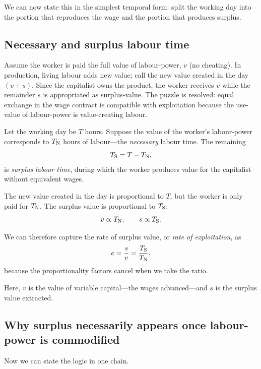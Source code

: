\medskip

We can now state this in the simplest temporal form: split the working day into the portion that
reproduces the wage and the portion that produces surplus.

\medskip

\subsection{Necessary and surplus labour time}

Assume the worker is paid the full value of labour-power, $v$ (no cheating). In
production, living labour adds new value; call the new value created in the day
$(v+s)$. Since the capitalist owns the product, the worker receives $v$ while the
remainder $s$ is appropriated as surplus-value. The puzzle is resolved: equal
exchange in the wage contract is compatible with exploitation because the use-value
of labour-power is value-creating labour.

Let the working day be $T$ hours. Suppose the value of the worker’s labour-power
corresponds to $T_{\mathrm{N}}$ hours of labour---the \emph{necessary} labour time. The
remaining
\begin{equation}
  T_{\mathrm{S}} = T - T_{\mathrm{N}},
  \label{eq:Ts}
\end{equation}
is \emph{surplus labour time}, during which the worker produces value for the
capitalist without equivalent wages.

The new value created in the day is proportional to $T$, but the worker is only
paid for $T_{\mathrm{N}}$. The surplus value is proportional to $T_{\mathrm{S}}$:
\[
  v \propto T_{\mathrm{N}},
  \qquad
  s \propto T_{\mathrm{S}}.
\]

We can therefore capture the rate of surplus value, or \emph{rate of
exploitation}, as
\begin{equation}
  e = \frac{s}{v} = \frac{T_{\mathrm{S}}}{T_{\mathrm{N}}},
  \label{eq:exploitation-time}
\end{equation}
because the proportionality factors cancel when we take the ratio.

Here, $v$ is the value of variable capital---the wages advanced---and $s$ is the
surplus value extracted.

\subsection{Why surplus necessarily appears once labour-power is commodified}
\label{sec:why-surplus}

Now we can state the logic in one chain.

